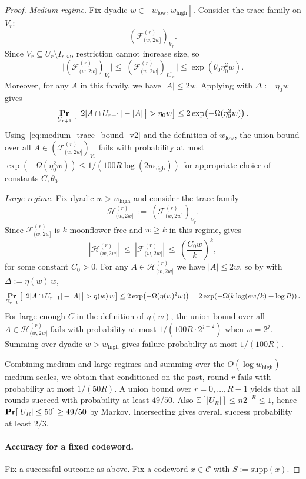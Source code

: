 \documentclass{article}
\DeclareMathOperator{\high}{\mathrm{high}}
\DeclareMathOperator{\low}{\mathrm{low}}
\renewcommand{\Pr}{\mathop{\bf Pr\/}}
\newcommand{\<}{\langle}
\renewcommand{\>}{\rangle}
\newcommand{\calC}{\mathcal{C}}
\newcommand{\calF}{\mathcal{F}}
\newcommand{\calH}{\mathcal{H}}
\newcommand{\E}{\mathbb{E}}
\newcommand{\supp}{\mathrm{supp}}
\begin{document}
\begin{proof}
\smallskip
\emph{Medium regime.}
Fix dyadic $w\in[w_{\low},w_{\high}]$. Consider the trace family on $V_r$:
\[
\left(\calF^{(r)}_{(w,2w]}\right)_{V_r}.
\]
Since $V_r\subseteq U_r\setminus I_{r,w}$, restriction cannot increase size, so
\[
\big|\left(\calF^{(r)}_{(w,2w]}\right)_{V_r}\big|
\le
\big|\left(\calF^{(r)}_{(w,2w]}\right)_{\overline{I_{r,w}}}\big| \leq \exp (\theta_0 \eta_0^2 w).
\]
Moreover, for any $A$ in this family, we have $|A|\le 2w$.
Applying  with $\Delta:=\eta_0 w$ gives 
\[
\Pr_{U_{r+1}}\left[\big|\,2|A\cap U_{r+1}|-|A|\,\big|>\eta_0 w\right]
\le
2\exp\!\left(-\Omega(\eta_0^2 w)\right).
\]
Using~\eqref{eq:medium_trace_bound_v2} and the definition of $w_{\low}$,
the union bound over all $A\in (\calF^{(r)}_{(w,2w]})_{V_r}$ fails with probability at most
$\exp(-\Omega(\eta_0^2 w))\le 1/(100R\log(2w_{\high}))$ for appropriate choice of constants $C, \theta_0$.

\smallskip
\emph{Large regime.}
Fix dyadic $w>w_{\high}$ and consider the trace family
\[
\calH^{(r)}_{(w,2w]}\ :=\ \left(\calF^{(r)}_{(w,2w]}\right)_{V_r}.
\]
Since $\calF^{(r)}_{(w,2w]}$ is $k$-moonflower-free and $w\ge k$ in this regime,
 gives 
\[
|\calH^{(r)}_{(w,2w]}|
\ \le\
|\calF^{(r)}_{(w,2w]}|
\ \le\
\left(\frac{C_0 w}{k}\right)^k,
\]
for some constant $C_0 > 0$.
For any $A\in\calH^{(r)}_{(w,2w]}$ we have $|A|\le 2w$, so by  with
$\Delta:=\eta(w)\,w$, 
\[
\Pr_{U_{r+1}}\left[\big|\,2|A\cap U_{r+1}|-|A|\,\big|>\eta(w)\,w\right]
\le
2\exp\!\left(-\Omega(\eta(w)^2 w)\right)
=
2\exp\!\left(-\Omega(k\log(e w/k)+\log R)\right).
\]
For large enough $C$ in the definition of $\eta(w)$, the union bound over all
$A\in\calH^{(r)}_{(w,2w]}$ fails with probability at most $1/(100R\cdot 2^{j+2})$
when $w=2^j$. Summing over dyadic $w>w_{\high}$ gives failure probability at most $1/(100R)$.

\smallskip
Combining medium and large regimes and summing over the $O(\log w_{\high})$ medium scales,
we obtain that conditioned on the past, round $r$ fails with probability at most $1/(50R)$.
A union bound over $r=0,\dots,R-1$ yields that all rounds succeed with probability at least $49/50$.
Also $\E[|U_R|]\le n2^{-R}\le 1$, hence $\Pr[|U_R|\le 50]\ge 49/50$ by Markov.
Intersecting gives overall success probability at least $2/3$.

\paragraph{Accuracy for a fixed codeword.}
Fix a successful outcome as above. Fix a codeword $x\in\calC$ with $S:=\supp(x)$.


\end{proof}
\end{document}
